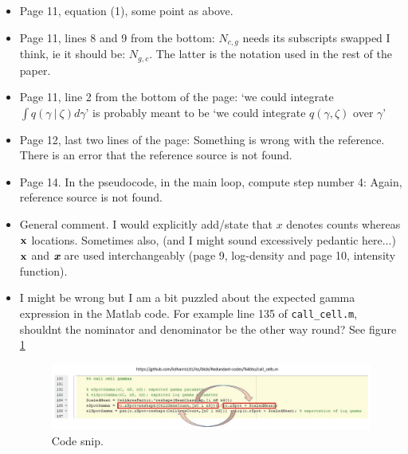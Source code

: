 \documentclass[12pt]{article}
\newcommand\givenbase[1][]{\:#1\lvert\:}
\let\given\givenbase
\begin{document}
\begin{itemize}
     \item Page 11, equation (1), some point as above.

     \item Page 11,  lines 8 and 9 from the bottom: $N_{c,g}$ needs its subscripts swapped I think, ie it should be: $N_{g,c}$.  The latter is the notation used in the rest of the paper.

    \item Page 11, line 2 from the bottom of the page: `we could integrate $\int q(\gamma \given \zeta) d\gamma$' is probably meant to be `we could integrate $q(\gamma, \zeta)$ over $\gamma$'

    \item Page 12, last two lines of the page: Something is wrong with the reference. There is an error that the reference source is not found.

   \item Page 14. In the pseudocode, in the main loop, compute step number 4: Again, reference source is not found. 

   \item General comment. I would explicitly add/state that $x$ denotes counts whereas ${\bf x}$ locations. Sometimes also, (and I might sound excessively pedantic here...) ${\bf x}$ and  $\textit{\textbf{x}}$ are used interchangeably (page 9, log-density and page 10, intensity function).

   \item I might be wrong but I am a bit puzzled about the expected gamma expression in the Matlab code. For example line 135 of \texttt{call\_cell.m}, shouldnt the nominator and denominator be the other way round? See  figure \ref{fig:eSpotGamma}

\begin{figure}[!ht]
  \includegraphics[width=\linewidth]{eSpotGamma.jpg}
  \caption{Code snip.}
  \label{fig:eSpotGamma}
\end{figure}



\end{itemize}
\end{document}
